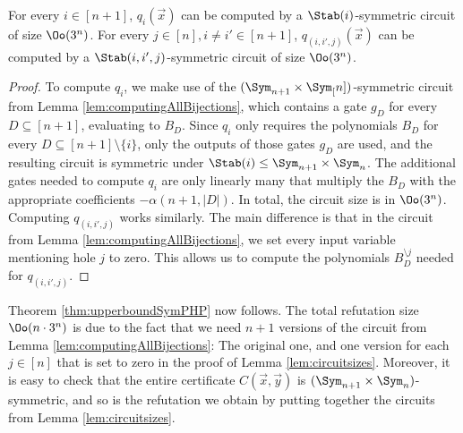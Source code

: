 \documentclass[a4paper,UKenglish,cleveref, autoref, thm-restate]{lipics-v2021}
\begin{document}
\begin{lemma}
	\label{lem:circuitsizes}
	For every $i \in [n+1]$, $q_i(\vec x)$ can be computed by a $\Stab(i)$-symmetric circuit of size $\Oo(3^n)$. For every $j \in [n], i \neq i' \in [n+1]$, $q_{(i,i',j)}(\vec x)$ can be computed by a $\Stab(i,i',j)$-symmetric circuit of size $\Oo(3^n)$.
\end{lemma}	
\begin{proof}
	To compute $q_i$, we make use of the $(\Sym_{n+1} \times \Sym_[n])$-symmetric circuit from Lemma \ref{lem:computingAllBijections}, which contains a gate $g_D$ for every $D \subseteq [n+1]$, evaluating to $B_D$. Since $q_i$ only requires the polynomials $B_D$ for every $D \subseteq [n+1] \setminus \{i\}$, only the outputs of those gates $g_D$ are used, and the resulting circuit is symmetric under $\Stab(i) \leq \Sym_{n+1} \times \Sym_{n}$. The additional gates needed to compute $q_i$ are only linearly many that multiply the $B_D$ with the appropriate coefficients $-\alpha(n+1,|D|)$. 	
	In total, the circuit size is in $\Oo(3^n)$.\\
	Computing $q_{(i,i',j)}$ works similarly. The main difference is that in the circuit from Lemma \ref{lem:computingAllBijections}, we set every input variable mentioning hole $j$ to zero. This allows us to compute the polynomials $B_D^{\setminus j}$ needed for $q_{(i,i',j)}$. 
\end{proof}	

Theorem \ref{thm:upperboundSymPHP} now follows. The total refutation size $\Oo(n \cdot 3^n)$ is due to the fact that we need $n+1$ versions of the circuit from Lemma \ref{lem:computingAllBijections}: The original one, and one version for each $j \in [n]$ that is set to zero in the proof of Lemma \ref{lem:circuitsizes}. Moreover, it is easy to check that the entire certificate $C(\vec x, \vec y)$ is $(\Sym_{n+1} \times \Sym_{n})$-symmetric, and so is the refutation we obtain by putting together the circuits from Lemma \ref{lem:circuitsizes}.
\end{document}

